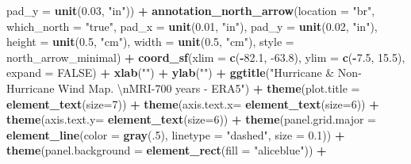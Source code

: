 \documentclass[12pt,twoside]{reedthesis}
\newenvironment{Shaded}{\begin{snugshade}}{\end{snugshade}}
\newcommand{\CharTok}[1]{\textcolor[rgb]{0.31,0.60,0.02}{#1}}
\newcommand{\DataTypeTok}[1]{\textcolor[rgb]{0.13,0.29,0.53}{#1}}
\newcommand{\DecValTok}[1]{\textcolor[rgb]{0.00,0.00,0.81}{#1}}
\newcommand{\FloatTok}[1]{\textcolor[rgb]{0.00,0.00,0.81}{#1}}
\newcommand{\KeywordTok}[1]{\textcolor[rgb]{0.13,0.29,0.53}{\textbf{#1}}}
\newcommand{\NormalTok}[1]{#1}
\newcommand{\OperatorTok}[1]{\textcolor[rgb]{0.81,0.36,0.00}{\textbf{#1}}}
\newcommand{\OtherTok}[1]{\textcolor[rgb]{0.56,0.35,0.01}{#1}}
\newcommand{\StringTok}[1]{\textcolor[rgb]{0.31,0.60,0.02}{#1}}
\begin{document}
\begin{Shaded}
\begin{Highlighting}[]
   \DataTypeTok{pad_y =} \KeywordTok{unit}\NormalTok{(}\FloatTok{0.03}\NormalTok{, }\StringTok{"in"}\NormalTok{)) }\OperatorTok{+}\StringTok{ }
\StringTok{  }\KeywordTok{annotation_north_arrow}\NormalTok{(}\DataTypeTok{location =} \StringTok{"br"}\NormalTok{, }\DataTypeTok{which_north =} \StringTok{"true"}\NormalTok{, }\DataTypeTok{pad_x =} \KeywordTok{unit}\NormalTok{(}\FloatTok{0.01}\NormalTok{, }\StringTok{"in"}\NormalTok{), }\DataTypeTok{pad_y =} \KeywordTok{unit}\NormalTok{(}\FloatTok{0.02}\NormalTok{, }\StringTok{"in"}\NormalTok{), }\DataTypeTok{height =} \KeywordTok{unit}\NormalTok{(}\FloatTok{0.5}\NormalTok{, }\StringTok{"cm"}\NormalTok{), }
   \DataTypeTok{width =} \KeywordTok{unit}\NormalTok{(}\FloatTok{0.5}\NormalTok{, }\StringTok{"cm"}\NormalTok{), }\DataTypeTok{style =}\NormalTok{ north_arrow_minimal) }\OperatorTok{+}
\StringTok{  }\KeywordTok{coord_sf}\NormalTok{(}\DataTypeTok{xlim =} \KeywordTok{c}\NormalTok{(}\OperatorTok{-}\FloatTok{82.1}\NormalTok{, }\FloatTok{-63.8}\NormalTok{), }\DataTypeTok{ylim =} \KeywordTok{c}\NormalTok{(}\OperatorTok{-}\FloatTok{7.5}\NormalTok{, }\FloatTok{15.5}\NormalTok{), }\DataTypeTok{expand =} \OtherTok{FALSE}\NormalTok{) }\OperatorTok{+}
\StringTok{  }\KeywordTok{xlab}\NormalTok{(}\StringTok{""}\NormalTok{) }\OperatorTok{+}\StringTok{ }
\StringTok{  }\KeywordTok{ylab}\NormalTok{(}\StringTok{""}\NormalTok{) }\OperatorTok{+}\StringTok{ }
\StringTok{  }\KeywordTok{ggtitle}\NormalTok{(}\StringTok{"Hurricane & Non-Hurricane Wind Map. }\CharTok{\textbackslash{}n}\StringTok{MRI-700 years - ERA5"}\NormalTok{) }\OperatorTok{+}\StringTok{ }
\StringTok{  }\KeywordTok{theme}\NormalTok{(}\DataTypeTok{plot.title =} \KeywordTok{element_text}\NormalTok{(}\DataTypeTok{size=}\DecValTok{7}\NormalTok{)) }\OperatorTok{+}
\StringTok{  }\KeywordTok{theme}\NormalTok{(}\DataTypeTok{axis.text.x=} \KeywordTok{element_text}\NormalTok{(}\DataTypeTok{size=}\DecValTok{6}\NormalTok{)) }\OperatorTok{+}\StringTok{ }
\StringTok{  }\KeywordTok{theme}\NormalTok{(}\DataTypeTok{axis.text.y=} \KeywordTok{element_text}\NormalTok{(}\DataTypeTok{size=}\DecValTok{6}\NormalTok{)) }\OperatorTok{+}
\StringTok{  }\KeywordTok{theme}\NormalTok{(}\DataTypeTok{panel.grid.major =} \KeywordTok{element_line}\NormalTok{(}\DataTypeTok{color =} \KeywordTok{gray}\NormalTok{(.}\DecValTok{5}\NormalTok{), }\DataTypeTok{linetype =} \StringTok{"dashed"}\NormalTok{, }\DataTypeTok{size =} \FloatTok{0.1}\NormalTok{)) }\OperatorTok{+}
\StringTok{  }\KeywordTok{theme}\NormalTok{(}\DataTypeTok{panel.background =} \KeywordTok{element_rect}\NormalTok{(}\DataTypeTok{fill =} \StringTok{"aliceblue"}\NormalTok{)) }\OperatorTok{+}

\end{Highlighting}
\end{Shaded}
\end{document}
